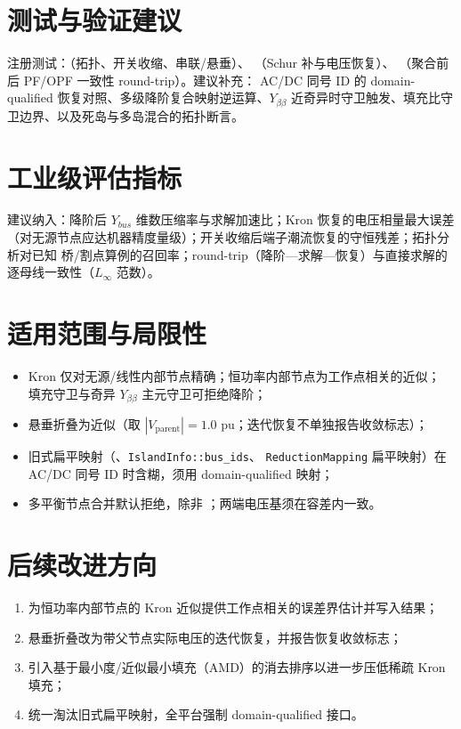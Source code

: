 \documentclass[UTF8,fontset=fandol,a4paper,11pt]{ctexart}
\begin{document}
\section{测试与验证建议}
注册测试：（拓扑、开关收缩、串联/悬垂）、
（Schur 补与电压恢复）、
（聚合前后 PF/OPF 一致性 round-trip）。建议补充：
AC/DC 同号 ID 的 domain-qualified 恢复对照、多级降阶复合映射逆运算、$Y_{\beta\beta}$
近奇异时守卫触发、填充比守卫边界、以及死岛与多岛混合的拓扑断言。

\section{工业级评估指标}
建议纳入：降阶后 $Y_{bus}$ 维数压缩率与求解加速比；Kron 恢复的电压相量最大误差
（对无源节点应达机器精度量级）；开关收缩后端子潮流恢复的守恒残差；拓扑分析对已知
桥/割点算例的召回率；round-trip（降阶—求解—恢复）与直接求解的逐母线一致性（$L_\infty$ 范数）。

\section{适用范围与局限性}
\begin{itemize}
  \item Kron 仅对无源/线性内部节点精确；恒功率内部节点为工作点相关的近似；
         填充守卫与奇异 $Y_{\beta\beta}$ 主元守卫可拒绝降阶；
  \item 悬垂折叠为近似（取 $|V_{\text{parent}}|=1.0$ pu；迭代恢复不单独报告收敛标志）；
  \item 旧式扁平映射（、\texttt{IslandInfo::bus\_ids}、
        \texttt{ReductionMapping} 扁平映射）在 AC/DC 同号 ID 时含糊，须用 domain-qualified 映射；
  \item 多平衡节点合并默认拒绝，除非 ；两端电压基须在容差内一致。
\end{itemize}

\section{后续改进方向}
\begin{enumerate}
  \item 为恒功率内部节点的 Kron 近似提供工作点相关的误差界估计并写入结果；
  \item 悬垂折叠改为带父节点实际电压的迭代恢复，并报告恢复收敛标志；
  \item 引入基于最小度/近似最小填充（AMD）的消去排序以进一步压低稀疏 Kron 填充；
  \item 统一淘汰旧式扁平映射，全平台强制 domain-qualified 接口。
\end{enumerate}


\end{document}
